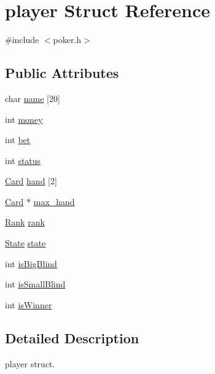 \hypertarget{structplayer}{\section{player Struct Reference}
\label{structplayer}
}


{\ttfamily \#include $<$poker.\+h$>$}

\subsection*{Public Attributes}
\begin{DoxyCompactItemize}
\item 
char \hyperlink{structplayer_a17d232d762df3060c9db525fbf90bb06}{name} \mbox{[}20\mbox{]}
\item 
int \hyperlink{structplayer_af29ec89834ba3675a99b4008b10422f2}{money}
\item 
int \hyperlink{structplayer_a0c5838d28a03958d82094cee91d73cd8}{bet}
\item 
int \hyperlink{structplayer_a79aedffc8c59ba13e1b882d3066fd8a9}{status}
\item 
\hyperlink{poker_8h_aacb186b77382a02f7317dc38797f37c2}{Card} \hyperlink{structplayer_a6da41d28aba13ce524b738fffc0fb058}{hand} \mbox{[}2\mbox{]}
\item 
\hyperlink{poker_8h_aacb186b77382a02f7317dc38797f37c2}{Card} $\ast$ \hyperlink{structplayer_a6979113d7c6c0e8345962fb397c4bf06}{max\+\_\+hand}
\item 
\hyperlink{poker_8h_a0991367a2e93f69582a2258ea315e261}{Rank} \hyperlink{structplayer_a9cfae91cf808c1b7518f48508865b29f}{rank}
\item 
\hyperlink{poker_8h_ad958b7c6a5231ab463ca88ad172b5f46}{State} \hyperlink{structplayer_ac23f62455d34a7b5d841b7e93284ee14}{state}
\item 
int \hyperlink{structplayer_aa29010f77b5955ef3a0d9cc59b13699a}{is\+Big\+Blind}
\item 
int \hyperlink{structplayer_a00d758277154f5f7990db0f2d849586a}{is\+Small\+Blind}
\item 
int \hyperlink{structplayer_ae3ed3af8f14bfaec499bac6ce8b6767f}{is\+Winner}
\end{DoxyCompactItemize}


\subsection{Detailed Description}
player struct. 

